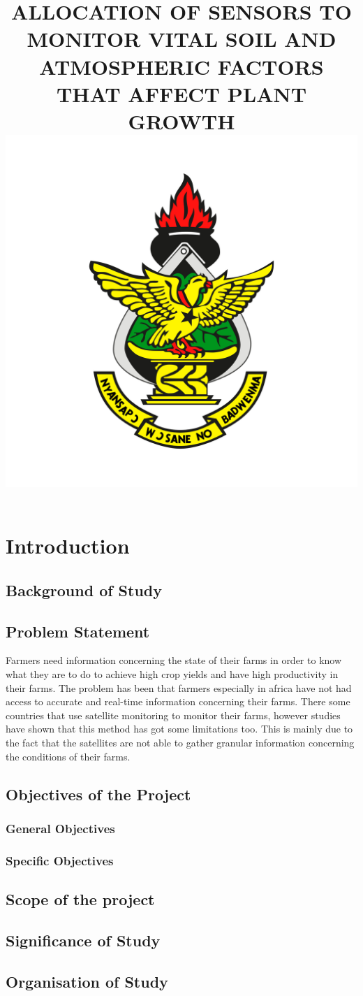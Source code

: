 \documentclass[12pt, a4paper]{article}
\title{ALLOCATION OF SENSORS TO MONITOR VITAL SOIL AND ATMOSPHERIC FACTORS THAT AFFECT PLANT GROWTH
\includegraphics[scale=0.6]{knust}}
\begin{document}
\maketitle
\section{Introduction}
\subsection{Background of Study}
\subsection{Problem Statement}
Farmers need information concerning the state of their farms in order to know what they are to do to achieve high crop yields and have high productivity in their farms. The problem has been that farmers especially in africa have not had access to accurate and real-time information concerning their farms. There some countries that use satellite monitoring to monitor their farms, however studies have shown that this method has got some limitations too. This is mainly due to the fact that the satellites are not able to gather granular information concerning the conditions of their farms.
\subsection{Objectives of the Project}
\subsubsection{General Objectives}
\subsubsection{Specific Objectives}
\subsection{Scope of the project}
\subsection{Significance of Study}
\subsection{Organisation of Study}
\end{document}

